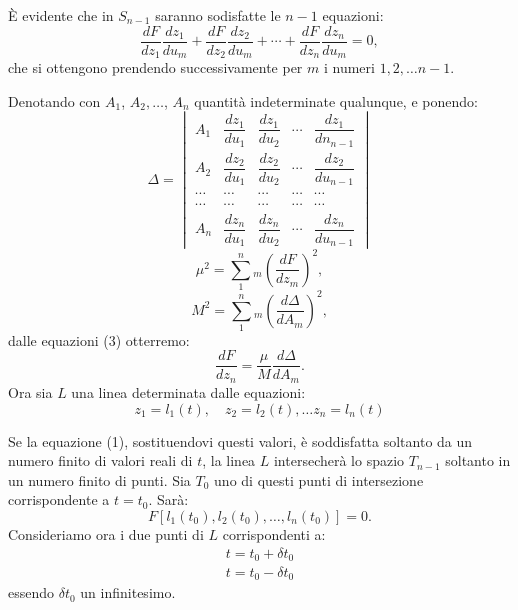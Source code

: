 \documentclass{article}
\begin{document}
È evidente che in $S_{n-1}$ saranno sodisfatte le $n-1$ equazioni:
\[ \frac{dF}{dz_{1}}\frac{dz_{1}}{du_{m}} + \frac{dF}{dz_{2}}\frac{dz_{2}}{du_{m}} + \cdots + \frac{dF}{dz_{n}}\frac{dz_{n}}{du_{m}} = 0, \tag{3} \]
che si ottengono prendendo successivamente per $m$ i numeri $1, 2,\ldots n-1$.

Denotando con $A_{1}$, $A_{2},\ldots$, $A_{n}$ quantità indeterminate qualunque, e ponendo:
\[
\Delta =
\begin{vmatrix}
A_{1} & \dfrac{dz_{1}}{du_{1}} & \dfrac{dz_{1}}{du_{2}} & \cdots & \dfrac{dz_{1}}{dn_{n-1}}\\[6pt]
A_{2} & \dfrac{dz_{2}}{du_{1}} & \dfrac{dz_{2}}{du_{2}} & \cdots & \dfrac{dz_{2}}{du_{n-1}}\\[6pt]
\cdots & \cdots & \cdots & \cdots & \cdots\\
\cdots & \cdots & \cdots & \cdots & \cdots\\
A_{n} & \dfrac{dz_{n}}{du_{1}} & \dfrac{dz_{n}}{du_{2}} & \cdots & \dfrac{dz_{n}}{du_{n-1}}
\end{vmatrix}
\tag{4}
\]
\[ \mu^{2} = \sum_{1}^{n}{}_{m}\left(\frac{dF}{dz_{m}}\right)^{2}, \tag{5} \]
\[ M^{2} = \sum_{1}^{n}{}_{m}\left(\frac{d\Delta}{dA_{m}}\right)^{2}, \tag{6} \]
dalle equazioni (3) otterremo:
\[ \frac{dF}{dz_{n}} = \frac{\mu}{M}\frac{d\Delta}{dA_{m}}. \tag{7} \]
Ora sia $L$ una linea determinata dalle equazioni:
\[ z_{1} = l_{1}(t), \quad z_{2} = l_{2}(t),\ldots z_{n} = l_{n}(t) \tag{8} \]


Se la equazione (1), sostituendovi questi valori, è soddisfatta soltanto da un numero finito di valori reali di $t$, la linea $L$ intersecherà lo spazio $T_{n-1}$ soltanto in un numero finito di punti. Sia $T_{0}$ uno di questi punti di intersezione corrispondente a $t = t_{0}$. Sarà:
\[ F[l_{1}(t_{0}), l_{2}(t_{0}),\ldots, l_{n}(t_{0})] = 0. \]
Consideriamo ora i due punti di $L$ corrispondenti a:
\[
\begin{gathered}
t = t_{0} + \delta t_{0}\\
t = t_{0} - \delta t_{0}
\end{gathered}
\]
essendo $\delta t_{0}$ un infinitesimo.
\end{document}
